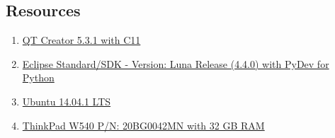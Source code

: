 \documentclass[11pt,english,a4paper]{article}
\begin{document}
\begin{flushleft}
\section{Resources}

\begin{enumerate}
\item{\href{http://qt-project.org/downloads}{QT Creator 5.3.1 with C11}}
\item{\href{https://www.eclipse.org/downloads/}{Eclipse Standard/SDK  - Version: Luna Release (4.4.0) with PyDev for Python}}
\item{\href{http://www.ubuntu.com/download/desktop}{Ubuntu 14.04.1 LTS}}
\item{\href{http://shop.lenovo.com/no/en/laptops/thinkpad/w-series/w540/#tab-reseller}{ThinkPad W540 P/N: 20BG0042MN with 32 GB RAM}}
\end{enumerate}


\end{flushleft}
\end{document}
